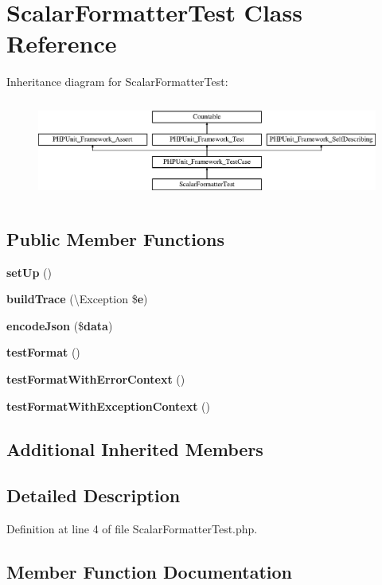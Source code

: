 \section{Scalar\+Formatter\+Test Class Reference}
\label{class_monolog_1_1_formatter_1_1_scalar_formatter_test}
Inheritance diagram for Scalar\+Formatter\+Test\+:\begin{figure}[H]
\begin{center}
\leavevmode
\includegraphics[height=3.303835cm]{class_monolog_1_1_formatter_1_1_scalar_formatter_test}
\end{center}
\end{figure}
\subsection*{Public Member Functions}
\begin{DoxyCompactItemize}
\item 
{\bf set\+Up} ()
\item 
{\bf build\+Trace} (\textbackslash{}Exception \${\bf e})
\item 
{\bf encode\+Json} (\${\bf data})
\item 
{\bf test\+Format} ()
\item 
{\bf test\+Format\+With\+Error\+Context} ()
\item 
{\bf test\+Format\+With\+Exception\+Context} ()
\end{DoxyCompactItemize}
\subsection*{Additional Inherited Members}


\subsection{Detailed Description}


Definition at line 4 of file Scalar\+Formatter\+Test.\+php.



\subsection{Member Function Documentation}

